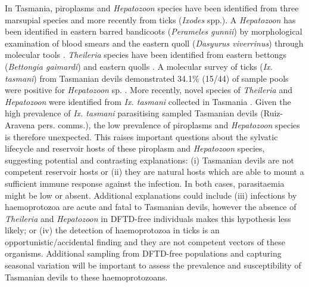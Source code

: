 \documentclass[a4paper, nobind]{templates/ociamthesis}
\begin{document}
In Tasmania, piroplasms and \emph{Hepatozoon} species have been identified from three marsupial species and more recently from ticks (\emph{Ixodes} spp.). A \emph{Hepatozoon} has been identified in eastern barred bandicoots (\emph{Perameles gunnii}) \autocite{bettiolFirstRecordMember1996} by morphological examination of blood smears and the eastern quoll (\emph{Dasyurus viverrinus}) through molecular tools \autocite{portasBaselineHealthDisease2020}. \emph{Theileria} species have been identified from eastern bettongs (\emph{Bettongia gaimardi}) \autocite{portasHealthEvaluationFreeranging2014} and eastern quolls \autocite{portasBaselineHealthDisease2020}. A molecular survey of ticks (\emph{Ix. tasmani}) from Tasmanian devils demonstrated 34.1\% (15/44) of sample pools were positive for \emph{Hepatozoon} sp. \autocite{vilcinsDetectionHepatozoonSpotted2009}. More recently, novel species of \emph{Theileria} and \emph{Hepatozoon} were identified from \emph{Ix. tasmani} collected in Tasmania \autocite{greayEndemicExoticNovel2018,lohMolecularSurveillancePiroplasms2018}. Given the high prevalence of \emph{Ix. tasmani} parasitising sampled Tasmanian devils (Ruiz-Aravena pers. comms.), the low prevalence of piroplasms and \emph{Hepatozoon} species is therefore unexpected. This raises important questions about the sylvatic lifecycle and reservoir hosts of these piroplasm and \emph{Hepatozoon} species, suggesting potential and contrasting explanations: (i) Tasmanian devils are not competent reservoir hosts or (ii) they are natural hosts which are able to mount a sufficient immune response against the infection. In both cases, parasitaemia might be low or absent. Additional explanations could include (iii) infections by haemoprotozoa are acute and fatal to Tasmanian devils, however the absence of \emph{Theileria} and \emph{Hepatozoon} in DFTD-free individuals makes this hypothesis less likely; or (iv) the detection of haemoprotozoa in ticks is an opportunistic/accidental finding and they are not competent vectors of these organisms. Additional sampling from DFTD-free populations and capturing seasonal variation will be important to assess the prevalence and susceptibility of Tasmanian devils to these haemoprotozoans.
\end{document}
